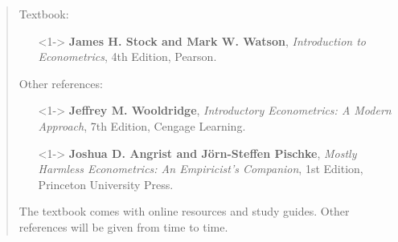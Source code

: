 

\begin{frame}%
\titlepage \vspace{-30pt}
\begin{quotation}\justifying\smallfont
\noindent
Textbook: \medskip
\begin{itemize}
\item[]<1-> \textbf{James H. Stock and Mark W. Watson}, \textit{Introduction to Econometrics}, 4th Edition, Pearson.
\end{itemize}
Other references:
\begin{itemize}
\item[]<1-> \textbf{Jeffrey M. Wooldridge}, \textit{Introductory Econometrics: A Modern Approach}, 7th Edition, Cengage Learning.
\item[]<1-> \textbf{Joshua D. Angrist and J\"{o}rn-Steffen Pischke}, \textit{Mostly Harmless Econometrics: An Empiricist's Companion}, 1st Edition, Princeton University Press.
\end{itemize}
The textbook comes with online resources and study guides. Other references will be given from time to time. 
\end{quotation}
\end{frame}


